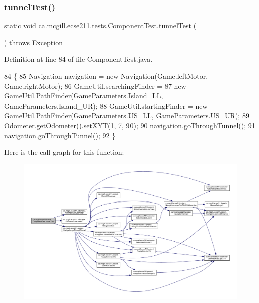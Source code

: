 \subsubsection{\texorpdfstring{tunnel\+Test()}{tunnelTest()}}
{\footnotesize\ttfamily static void ca.\+mcgill.\+ecse211.\+tests.\+Component\+Test.\+tunnel\+Test (\begin{DoxyParamCaption}{ }\end{DoxyParamCaption}) throws Exception\hspace{0.3cm}{\ttfamily [static]}}



Definition at line 84 of file Component\+Test.\+java.


\begin{DoxyCode}
84                                                    \{
85     Navigation navigation = \textcolor{keyword}{new} Navigation(Game.leftMotor, Game.rightMotor);
86     GameUtil.searchingFinder =
87         \textcolor{keyword}{new} GameUtil.PathFinder(GameParameters.Island\_LL, GameParameters.Island\_UR);
88     GameUtil.startingFinder = \textcolor{keyword}{new} GameUtil.PathFinder(GameParameters.US\_LL, GameParameters.US\_UR);
89     Odometer.getOdometer().setXYT(1, 7, 90);
90     navigation.goThroughTunnel();
91     navigation.goThroughTunnel();
92   \}
\end{DoxyCode}
Here is the call graph for this function\+:
\nopagebreak
\begin{figure}[H]
\begin{center}
\leavevmode
\includegraphics[width=350pt]{enumca_1_1mcgill_1_1ecse211_1_1tests_1_1_component_test_ae85caa20c6391bacc4fdbd411ee3f113_cgraph}
\end{center}
\end{figure}
\mbox{\label{enumca_1_1mcgill_1_1ecse211_1_1tests_1_1_component_test_a05cd9d95458b11ed57ca001a28fffa7c}} 
